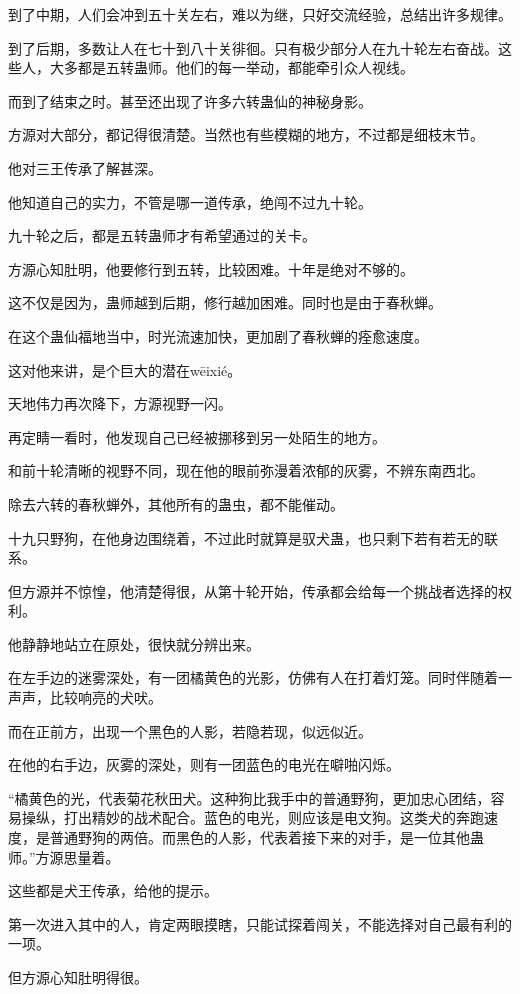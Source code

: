 \begin{this_body}
到了中期，人们会冲到五十关左右，难以为继，只好交流经验，总结出许多规律。

到了后期，多数让人在七十到八十关徘徊。只有极少部分人在九十轮左右奋战。这些人，大多都是五转蛊师。他们的每一举动，都能牵引众人视线。

而到了结束之时。甚至还出现了许多六转蛊仙的神秘身影。

方源对大部分，都记得很清楚。当然也有些模糊的地方，不过都是细枝末节。

他对三王传承了解甚深。

他知道自己的实力，不管是哪一道传承，绝闯不过九十轮。

九十轮之后，都是五转蛊师才有希望通过的关卡。

方源心知肚明，他要修行到五转，比较困难。十年是绝对不够的。

这不仅是因为，蛊师越到后期，修行越加困难。同时也是由于春秋蝉。

在这个蛊仙福地当中，时光流速加快，更加剧了春秋蝉的痊愈速度。

这对他来讲，是个巨大的潜在wēixié。

天地伟力再次降下，方源视野一闪。

再定睛一看时，他发现自己已经被挪移到另一处陌生的地方。

和前十轮清晰的视野不同，现在他的眼前弥漫着浓郁的灰雾，不辨东南西北。

除去六转的春秋蝉外，其他所有的蛊虫，都不能催动。

十九只野狗，在他身边围绕着，不过此时就算是驭犬蛊，也只剩下若有若无的联系。

但方源并不惊惶，他清楚得很，从第十轮开始，传承都会给每一个挑战者选择的权利。

他静静地站立在原处，很快就分辨出来。

在左手边的迷雾深处，有一团橘黄色的光影，仿佛有人在打着灯笼。同时伴随着一声声，比较响亮的犬吠。

而在正前方，出现一个黑色的人影，若隐若现，似远似近。

在他的右手边，灰雾的深处，则有一团蓝色的电光在噼啪闪烁。

“橘黄色的光，代表菊花秋田犬。这种狗比我手中的普通野狗，更加忠心团结，容易操纵，打出精妙的战术配合。蓝色的电光，则应该是电文狗。这类犬的奔跑速度，是普通野狗的两倍。而黑色的人影，代表着接下来的对手，是一位其他蛊师。”方源思量着。

这些都是犬王传承，给他的提示。

第一次进入其中的人，肯定两眼摸瞎，只能试探着闯关，不能选择对自己最有利的一项。

但方源心知肚明得很。


\end{this_body}

